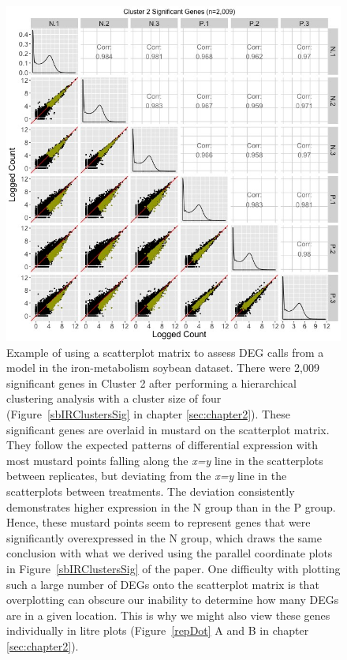 \documentclass[11pt,a4paper,oldfontcommands,openany]{memoir}
\numberwithin{equation}{section} %
\begin{document}
\begin{figure}[t!]
\begin{framed}
\centerline{\includegraphics[width=\columnwidth]{MakeFigures/sbIRClusterSigSM2.jpg}}
\end{framed}
\caption{Example of using a scatterplot matrix to assess DEG calls from a model in the iron-metabolism soybean dataset. There were 2,009 significant genes in Cluster 2 after performing a hierarchical clustering analysis with a cluster size of four (Figure~\ref{sbIRClustersSig} in chapter \ref{sec:chapter2}). These significant genes are overlaid in mustard on the scatterplot matrix. They follow the expected patterns of differential expression with most mustard points falling along the \textit{x=y} line in the scatterplots between replicates, but deviating from the \textit{x=y} line in the scatterplots between treatments. The deviation consistently demonstrates higher expression in the N group than in the P group. Hence, these mustard points seem to represent genes that were significantly overexpressed in the N group, which draws the same conclusion with what we derived using the parallel coordinate plots in Figure~\ref{sbIRClustersSig} of the paper. One difficulty with plotting such a large number of DEGs onto the scatterplot matrix is that overplotting can obscure our inability to determine how many DEGs are in a given location. This is why we might also view these genes individually in litre plots (Figure~\ref{repDot} A and B in chapter \ref{sec:chapter2}).
\label{sbIRClusterSigSM2}}
\end{figure}
  
\end{document}

